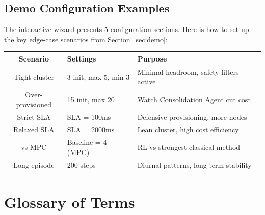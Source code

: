 \documentclass[11pt,a4paper]{article}
\begin{document}
\subsection{Demo Configuration Examples}

The interactive wizard presents 5 configuration sections.
Here is how to set up the key edge-case scenarios from Section~\ref{sec:demo}:

\begin{center}
\begin{tabular}{clp{6cm}}
\toprule
\textbf{Scenario} & \textbf{Settings} & \textbf{Purpose} \\
\midrule
Tight cluster & 3 init, max 5, min 3 & Minimal headroom, safety filters active \\
Over-provisioned & 15 init, max 20 & Watch Consolidation Agent cut cost \\
Strict SLA & SLA = 100ms & Defensive provisioning, more nodes \\
Relaxed SLA & SLA = 2000ms & Lean cluster, high cost efficiency \\
vs MPC & Baseline = 4 (MPC) & RL vs strongest classical method \\
Long episode & 200 steps & Diurnal patterns, long-term stability \\
\bottomrule
\end{tabular}
\end{center}


\section{Glossary of Terms}
\end{document}

